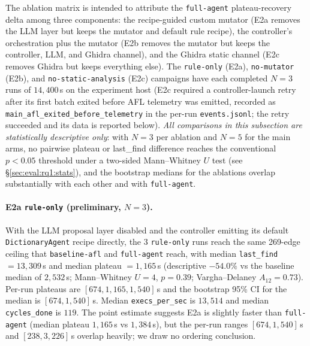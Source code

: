 \documentclass[11pt]{article}
\begin{document}
The ablation matrix is intended to attribute the
\texttt{full-agent} plateau-recovery delta among three components:
the recipe-guided custom mutator (E2a removes the LLM layer but
keeps the mutator and default rule recipe), the controller's
orchestration plus the mutator (E2b removes the mutator but keeps
the controller, LLM, and Ghidra channel), and the Ghidra static
channel (E2c removes Ghidra but keeps everything else). The
\texttt{rule-only} (E2a), \texttt{no-mutator} (E2b), and
\texttt{no-static-analysis} (E2c) campaigns have each completed
$N{=}3$ runs of $14{,}400$\,s on the experiment host (E2c
required a controller-launch retry after its first batch
exited before AFL telemetry was emitted, recorded as
\texttt{main\_afl\_exited\_before\_telemetry} in the per-run
\texttt{events.jsonl}; the retry succeeded and its data is
reported below). \emph{All comparisons in this subsection are
statistically descriptive only}: with $N{=}3$ per ablation and
$N{=}5$ for the main arms, no pairwise plateau or last\_find
difference reaches the conventional $p{<}0.05$ threshold under a
two-sided Mann--Whitney $U$ test (see
\S\ref{sec:eval:rq1:stats}), and the bootstrap medians for the
ablations overlap substantially with each other and with
\texttt{full-agent}.

\paragraph{E2a \texttt{rule-only} (preliminary, $N{=}3$).}
With the LLM proposal layer disabled and the controller emitting
its default \texttt{DictionaryAgent} recipe directly, the 3
\texttt{rule-only} runs reach the same 269-edge ceiling that
\texttt{baseline-afl} and \texttt{full-agent} reach, with median
\texttt{last\_find}~$=13{,}309$\,s and median plateau
$=1{,}165$\,s (descriptive $-54.0\%$ vs the baseline median of
$2{,}532$\,s; Mann--Whitney $U{=}4$, $p{=}0.39$; Vargha--Delaney
$A_{12}{=}0.73$). Per-run plateaus are $[674, 1{,}165, 1{,}540]$\,s
and the bootstrap 95\% CI for the median is $[674, 1{,}540]$\,s.
Median \texttt{execs\_per\_sec} is $13{,}514$ and median
\texttt{cycles\_done} is $119$. The point estimate suggests E2a is
slightly faster than \texttt{full-agent} (median plateau
$1{,}165$\,s vs $1{,}384$\,s), but the per-run ranges
$[674, 1{,}540]$\,s and $[238, 3{,}226]$\,s overlap heavily; we
draw no ordering conclusion.
\end{document}
